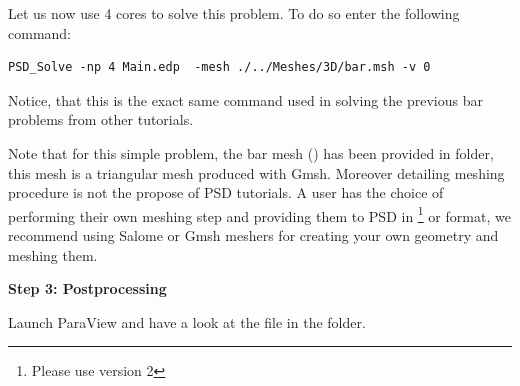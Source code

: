 Let us now use 4 cores to solve this problem. To do so enter the
following command:

\begin{lstlisting}[style=BashInputStyle]
PSD_Solve -np 4 Main.edp  -mesh ./../Meshes/3D/bar.msh -v 0
\end{lstlisting}

Notice, that this is the exact same command used in solving the previous
bar problems from other tutorials.

Note that for this simple problem, the bar mesh () has been
provided in  folder, this mesh is a triangular mesh
produced with Gmsh. Moreover detailing meshing procedure is not the
propose of PSD tutorials. A user has the choice of performing their own
meshing step and providing them to PSD in
\footnote{Please use version 2} or  format, we
recommend using Salome or Gmsh meshers for creating your own geometry
and meshing them.

\textbf{Step 3: Postprocessing}

Launch ParaView and have a look at the  file in the
 folder.

